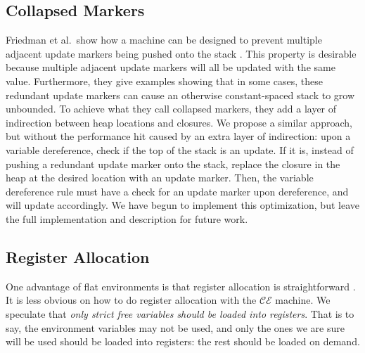 \subsection{Collapsed Markers}
Friedman et al.\ show how a machine can be designed to prevent multiple adjacent
update markers being pushed onto the stack \cite{lkm}.  This property is
desirable because multiple adjacent update markers will all be updated with the
same value. Furthermore, they give examples showing that in some cases, these
redundant update markers can cause an otherwise constant-spaced stack to grow
unbounded. To achieve what they call collapsed markers, they add a layer
of indirection between heap locations and closures. We propose a similar
approach, but without the performance hit caused by an extra layer of
indirection: upon a variable dereference, check if the top of the stack is an
update. If it is, instead of pushing a redundant update marker onto the stack,
replace the closure in the heap at the desired location with an update marker.
Then, the variable dereference rule must have a check for an update marker upon
dereference, and will update accordingly. We have begun to implement this
optimization, but leave the full implementation and description for future work.

\subsection{Register Allocation} \label{sec:alloc}
One advantage of flat environments is that register allocation is
straightforward \cite{appel2006compiling,jonesstg,terei2010llvm}. It is less
obvious on how to do register allocation with the $\mathcal{CE}$ machine.
We speculate that \emph{only strict free variables should be loaded into
registers}. That is to say, the environment variables may not be used, and only
the ones we are sure will be used should be loaded into registers: the rest
should be loaded on demand.

